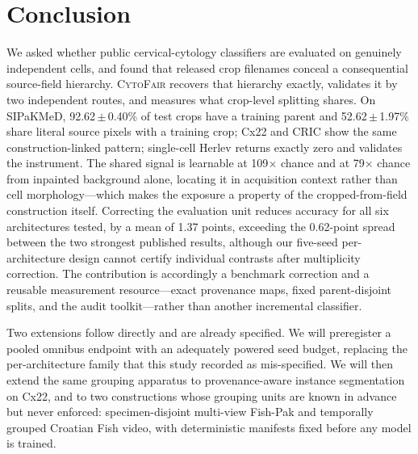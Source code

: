 \documentclass[conference]{IEEEtran}
\newcommand{\meanpm}[2]{#1\,$\pm$\,#2}
\newcommand{\cytofair}{\textsc{CytoFair}}
\begin{document}
\section{Conclusion}
\label{sec:conclusion}
We asked whether public cervical-cytology classifiers are evaluated on genuinely independent cells, and found that released crop filenames conceal a consequential source-field hierarchy.
\cytofair{} recovers that hierarchy exactly, validates it by two independent routes, and measures what crop-level splitting shares.
On SIPaKMeD, \meanpm{92.62}{0.40}\% of test crops have a training parent and \meanpm{52.62}{1.97}\% share literal source pixels with a training crop; Cx22 and CRIC show the same construction-linked pattern; single-cell Herlev returns exactly zero and validates the instrument.
The shared signal is learnable at 109$\times$ chance and at 79$\times$ chance from inpainted background alone, locating it in acquisition context rather than cell morphology---which makes the exposure a property of the cropped-from-field construction itself.
Correcting the evaluation unit reduces accuracy for all six architectures tested, by a mean of 1.37 points, exceeding the 0.62-point spread between the two strongest published results, although our five-seed per-architecture design cannot certify individual contrasts after multiplicity correction.
The contribution is accordingly a benchmark correction and a reusable measurement resource---exact provenance maps, fixed parent-disjoint splits, and the audit toolkit---rather than another incremental classifier.

Two extensions follow directly and are already specified.
We will preregister a pooled omnibus endpoint with an adequately powered seed budget, replacing the per-architecture family that this study recorded as mis-specified.
We will then extend the same grouping apparatus to provenance-aware instance segmentation on Cx22, and to two constructions whose grouping units are known in advance but never enforced: specimen-disjoint multi-view Fish-Pak and temporally grouped Croatian Fish video, with deterministic manifests fixed before any model is trained.


{\scriptsize}
\end{document}
